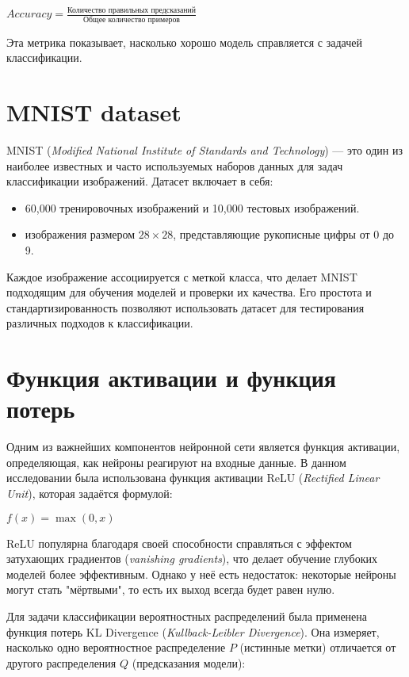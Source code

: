\begin{math}
    Accuracy = \frac{\text{Количество правильных предсказаний}}{\text{Общее количество примеров}}
\end{math} \cite{lib:neuron}

Эта метрика показывает, насколько хорошо модель справляется с задачей классификации.

\section{MNIST dataset}

MNIST (\textit{Modified National Institute of Standards and Technology}) — это один из наиболее известных и
часто используемых наборов данных для задач классификации изображений. 
Датасет включает в себя:
\begin{itemize}
    \item 60,000 тренировочных изображений и 10,000 тестовых изображений.
    \item изображения размером \(28 \times 28\), представляющие рукописные цифры от 0 до 9.
\end{itemize}

Каждое изображение ассоциируется с меткой класса, что делает MNIST подходящим для обучения моделей и проверки их качества. 
Его простота и стандартизированность позволяют использовать датасет для тестирования различных подходов к классификации.

\section{Функция активации и функция потерь}

Одним из важнейших компонентов нейронной сети является функция активации, определяющая, 
как нейроны реагируют на входные данные. 
В данном исследовании была использована функция активации ReLU (\textit{Rectified Linear Unit}), 
которая задаётся формулой:

\begin{math}
    f(x) = \max(0, x)
    \label{ReLU}
\end{math} \cite{lib:ReLU}

ReLU популярна благодаря своей способности справляться с эффектом затухающих градиентов (\textit{vanishing gradients}), 
что делает обучение глубоких моделей более эффективным. 
Однако у неё есть недостаток: некоторые нейроны могут стать "мёртвыми", то есть их выход всегда будет равен нулю.

Для задачи классификации вероятностных распределений была применена функция потерь KL Divergence (\textit{Kullback-Leibler Divergence}). 
Она измеряет, насколько одно вероятностное распределение \(P\) (истинные метки) отличается от другого распределения \(Q\) (предсказания модели):

